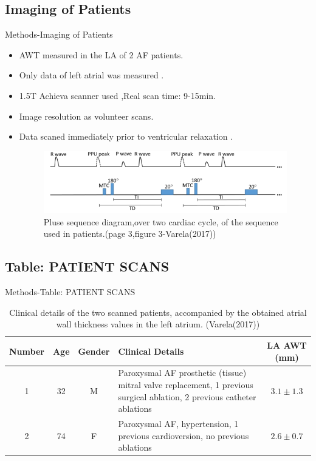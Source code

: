 \documentclass[aspectratio=43]{beamer}
\begin{document}
\subsection{Imaging of Patients}
\begin{frame}{Methods-Imaging of Patients}
\begin{itemize}
\item AWT measured in the LA of 2 AF patients.
\item Only data of left atrial was measured .
\item 1.5T  Achieva scanner used ,Real scan time: 9-15min.
\item Image resolution as volunteer scans.
\item Data scaned immediately prior to ventricular relaxation .
\begin{figure}[h!]
\includegraphics[width=\linewidth]{img/img2}
\caption{Pluse sequence diagram,over two cardiac cycle, of the sequence used in patients.(page 3,figure 3-Varela(2017))}
\end{figure}
\end{itemize}
\end{frame}

\newpage
\subsection{Table: PATIENT SCANS}
\begin{frame}{Methods-Table: PATIENT SCANS}


\begin{table} 
\begin{center}
  \begin{tabular}{c c c p{4cm} c}
    \hline
     Number& Age & Gender & Clinical Details & LA AWT (mm) \\ \hline
     
    \hline
    1 & 32 & M & Paroxysmal AF \newline prosthetic (tissue) mitral valve replacement, 1 previous surgical ablation, 2 previous catheter ablations & \begin{math}
    3.1\pm1.3
\end{math}
\\ \hline
2 & 74 & F & Paroxysmal AF, hypertension, 1 previous cardioversion, no previous ablations & \begin{math}
    2.6\pm 0.7
\end{math} 
\\ \hline \hline


  \end{tabular}
  \caption{Clinical details of the two scanned patients, accompanied by the obtained atrial wall thickness values in the left atrium. (Varela(2017))}
 

\end{center}
 \end{table}
 \end{frame}
 
\end{document}
